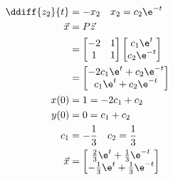 \documentclass{math}
\begin{document}
\begin{align*}
  \ddiff{z_2}{t} &= -x_2 \quad x_2 = c_2\e^{-t} \\
  \vec{x} &= P\vec{z} \\
  &= \begin{bmatrix}-2 & 1 \\ 1 & 1\end{bmatrix}\begin{bmatrix}
    c_1\e^t \\ c_2\e^{-t}
  \end{bmatrix} \\
  &= \begin{bmatrix}
    -2c_1\e^t+c_2\e^{-t} \\ c_1\e^t+c_2\e^{-t}
  \end{bmatrix} \\
  x(0) &= 1 = -2c_1+c_2 \\
  y(0) &= 0 = c_1+c_2 \\
  c_1 &= -\frac{1}{3} \quad c_2 = \frac{1}{3} \\
  \vec{x} &= \begin{bmatrix}
    \frac{2}{3}\e^t+\frac{1}{3}\e^{-t} \\
    -\frac{1}{3}\e^t+\frac{1}{3}\e^{-t}
  \end{bmatrix}
\end{align*}
\end{document}
